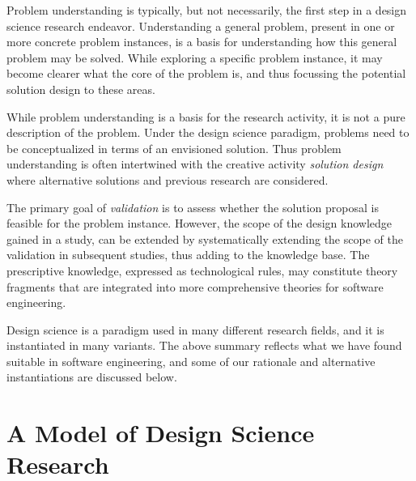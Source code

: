 \documentclass[graybox]{svmult}
\newcommand{\emelie}[1]{\textcolor{red}{{\it [Emelie says: #1]}}}
\newcommand{\emelie}[1]{}
\begin{document}
Problem understanding is typically, but not necessarily, the first step in a design science research endeavor. Understanding a general problem, present in one or more concrete problem instances, is a basis for understanding how this general problem may be solved.  While exploring a specific problem instance,   it may become clearer what the core of the problem is, and thus focussing the potential solution design to these areas. 

While problem understanding is a basis for the research activity, it is not a pure description of the problem. Under the design science paradigm, problems need to be conceptualized in terms of an envisioned solution. Thus problem understanding is often intertwined with the creative activity \emph{solution design} where alternative solutions and previous research are considered. %


 The primary goal of \emph{validation} is to assess whether the solution proposal is feasible for the problem instance. However, the scope of the design knowledge gained in a study, can be extended by systematically extending the scope of the validation in subsequent studies, thus adding to the knowledge base. The prescriptive knowledge, expressed as technological rules, may constitute theory fragments that are integrated into more comprehensive theories for software engineering. 


Design science is a paradigm used in many different research fields, and it is instantiated in many variants.  The above summary reflects what we have found suitable in software engineering, and some of our rationale and alternative instantiations are discussed below.



\section{A Model of Design Science Research}
\label{sec:DesignScienceResearch}
\end{document}
